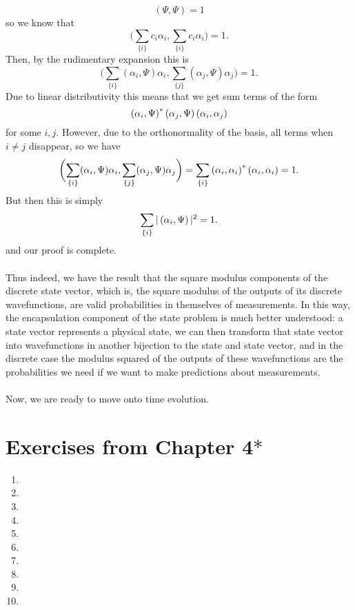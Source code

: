 $$
(\Psi,\Psi)=1
$$
so we know that 
$$
\biggl(\sum_{\{i\}}c_{i}\alpha_{i},\sum_{\{i\}}c_{i}\alpha_{i}\biggr)=1.
$$
Then, by the rudimentary expansion this is 
$$
\biggl(\sum_{\{i\}}(\alpha_{i},\Psi)\alpha_{i},\sum_{\{j\}}(\alpha_{j},\Psi)\alpha_{j}\biggr)=1.
$$
Due to linear distributivity this means that we get sum terms of the form
$$
\left(\alpha_{i},\Psi\right)^{\ast}\left(\alpha_{j},\Psi\right)\left(\alpha_{i},\alpha_{j}\right)
$$
for some $i,j$. However, due to the orthonormality of the basis, all terms when $i\neq j$ disappear, so we have 
$$
\biggl(\sum_{\{i\}}(\alpha_{i},\Psi)\alpha_{i},\sum_{\{j\}}(\alpha_{j},\Psi)\alpha_{j}\biggr)=\sum_{\{i\}}\left(\alpha_{i},\alpha_{i}\right)^{\ast}\left(\alpha_{i},\alpha_{i}\right)=1.
$$
But then this is simply
$$
\sum_{\{i\}}|\left(\alpha_{i},\Psi\right)|^2=1.
$$
and our proof is complete.
\\\\
Thus indeed, we have the result that the square modulus components of the discrete state vector, which is, the square modulus of the outputs of its discrete wavefunctions, are valid probabilities in themselves of measurements. In this way, the encapsulation component of the state problem is much better understood: a state vector represents a physical state, we can then transform that state vector into wavefunctions in another bijection to the state and state vector, and in the discrete case the modulus squared of the outputs of these wavefunctions are the probabilities we need if we want to make predictions about measurements.
\\\\
Now, we are ready to move onto time evolution.
\section{Exercises from Chapter 4$\ast$}
\begin{enumerate}
    \item 
    \item
    \item
    \item
    \item
    \item
    \item
    \item
    \item
    \item
\end{enumerate}